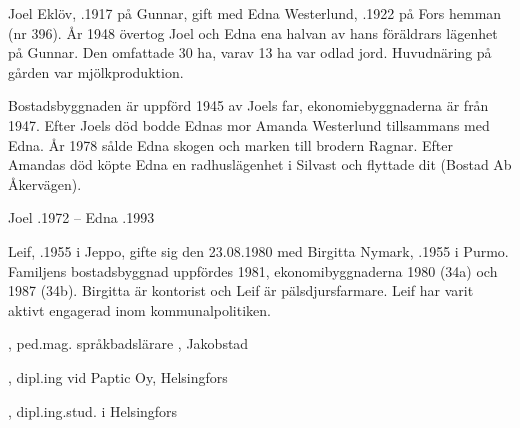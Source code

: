 Joel Eklöv, .1917 på Gunnar, gift med Edna Westerlund, .1922 på Fors hemman (nr 396). År 1948 övertog Joel och Edna ena halvan av hans föräldrars lägenhet på Gunnar. Den omfattade 30 ha, varav 13 ha var odlad jord. Huvudnäring på gården var mjölkproduktion.

Bostadsbyggnaden är uppförd 1945 av Joels far, ekonomiebyggnaderna är från 1947. Efter Joels död bodde Ednas mor Amanda Westerlund tillsammans med Edna. År 1978 sålde Edna skogen och marken till brodern Ragnar. Efter Amandas död köpte Edna en radhuslägenhet i Silvast och flyttade dit (Bostad Ab Åkervägen).

Joel .1972  --  Edna .1993





Leif, .1955 i Jeppo, gifte sig den 23.08.1980 med Birgitta Nymark, .1955 i Purmo. Familjens bostadsbyggnad uppfördes 1981, ekonomibyggnaderna 1980 (34a) och 1987 (34b). Birgitta är kontorist och Leif är pälsdjursfarmare. Leif har varit aktivt engagerad inom kommunalpolitiken.

\begin{jhchildren}
  \item {}, ped.mag. språkbadslärare , Jakobstad
  \item {}, dipl.ing vid Paptic Oy, Helsingfors
  \item {}, dipl.ing.stud. i Helsingfors
\end{jhchildren}
